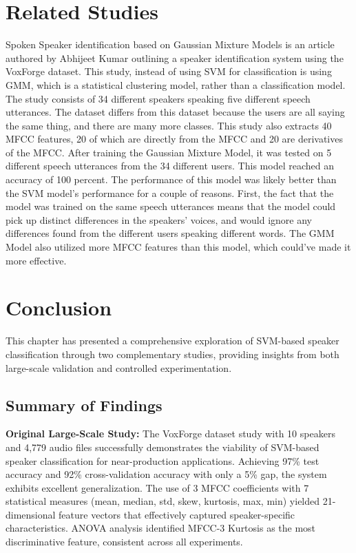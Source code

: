 \documentclass[11pt,twoside,openany]{book}
\begin{document}
\section{Related Studies}
Spoken Speaker identification based on Gaussian Mixture Models is an article authored by Abhijeet Kumar outlining a speaker identification system using the VoxForge dataset. This study, instead of using SVM for classification is using GMM, which is a statistical clustering model, rather than a classification model. The study consists of 34 different speakers speaking five different speech utterances. The dataset differs from this dataset because the users are all saying the same thing, and there are many more classes. This study also extracts 40 MFCC features, 20 of which are directly from the MFCC and 20 are derivatives of the MFCC. After training the Gaussian Mixture Model, it was tested on 5 different speech utterances from the 34 different users. This model reached an accuracy of 100 percent. The performance of this model was likely better than the SVM model's performance for a couple of reasons. First, the fact that the model was trained on the same speech utterances means that the model could pick up distinct differences in the speakers' voices, and would ignore any differences found from the different users speaking different words. The GMM Model also utilized more MFCC features than this model, which could've made it more effective. \cite{gmm_speaker_recognition}
\section{Conclusion}
This chapter has presented a comprehensive exploration of SVM-based speaker classification through two complementary studies, providing insights from both large-scale validation and controlled experimentation.

\subsection{Summary of Findings}

\textbf{Original Large-Scale Study:} The VoxForge dataset study with 10 speakers and 4,779 audio files successfully demonstrates the viability of SVM-based speaker classification for near-production applications. Achieving 97\% test accuracy and 92\% cross-validation accuracy with only a 5\% gap, the system exhibits excellent generalization. The use of 3 MFCC coefficients with 7 statistical measures (mean, median, std, skew, kurtosis, max, min) yielded 21-dimensional feature vectors that effectively captured speaker-specific characteristics. ANOVA analysis identified MFCC-3 Kurtosis as the most discriminative feature, consistent across all experiments.
\end{document}
